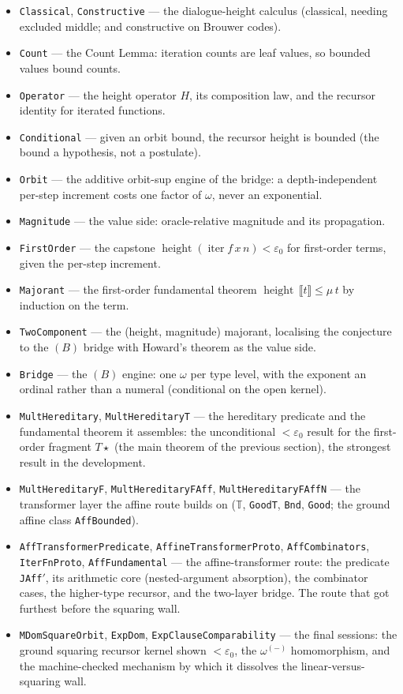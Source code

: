 \documentclass[11pt]{article}
\newcommand{\eps}{\varepsilon_0}
\newcommand{\iterop}{\operatorname{iter}}
\newcommand{\height}{\operatorname{height}}
\newcommand{\code}[1]{\texttt{#1}}
\theoremstyle{definition}
\begin{document}
\begin{itemize}
\item \code{Classical}, \code{Constructive} --- the dialogue-height calculus
  (classical, needing excluded middle; and constructive on Brouwer codes).
\item \code{Count} --- the Count Lemma: iteration counts are leaf values, so
  bounded values bound counts.
\item \code{Operator} --- the height operator $H$, its composition law, and the
  recursor identity for iterated functions.
\item \code{Conditional} --- given an orbit bound, the recursor height is bounded
  (the bound a hypothesis, not a postulate).
\item \code{Orbit} --- the additive orbit-sup engine of the bridge: a
  depth-independent per-step increment costs one factor of $\omega$, never an
  exponential.
\item \code{Magnitude} --- the value side: oracle-relative magnitude and its
  propagation.
\item \code{FirstOrder} --- the capstone $\height(\iterop f\,x\,n)<\eps$ for
  first-order terms, given the per-step increment.
\item \code{Majorant} --- the first-order fundamental theorem
  $\height\,\llbracket t\rrbracket\le\mu\,t$ by induction on the term.
\item \code{TwoComponent} --- the (height, magnitude) majorant, localising the
  conjecture to the $(B)$ bridge with Howard's theorem as the value side.
\item \code{Bridge} --- the $(B)$ engine: one $\omega$ per type level, with the
  exponent an ordinal rather than a numeral (conditional on the open kernel).
\item \code{MultHereditary}, \code{MultHereditaryT} --- the hereditary predicate
  and the fundamental theorem it assembles: the unconditional $<\eps$ result for
  the first-order fragment $T\star$ (the main theorem of the previous section), the
  strongest result in the development.
\item \code{MultHereditaryF}, \code{MultHereditaryFAff}, \code{MultHereditaryFAffN}
  --- the transformer layer the affine route builds on ($\mathbb{T}$,
  \code{GoodT}, \code{Bnd}, \code{Good}; the ground affine class \code{AffBounded}).
\item \code{AffTransformerPredicate}, \code{AffineTransformerProto},
  \code{AffCombinators}, \code{IterFnProto}, \code{AffFundamental} --- the
  affine-transformer route: the predicate \code{JAff$'$}, its arithmetic core
  (nested-argument absorption), the combinator cases, the higher-type recursor,
  and the two-layer bridge. The route that got furthest before the squaring wall.
\item \code{MDomSquareOrbit}, \code{ExpDom}, \code{ExpClauseComparability} --- the
  final sessions: the ground squaring recursor kernel shown $<\eps$, the
  $\omega^{(-)}$ homomorphism, and the machine-checked mechanism by which it dissolves
  the linear-versus-squaring wall.
\end{itemize}
\end{document}
